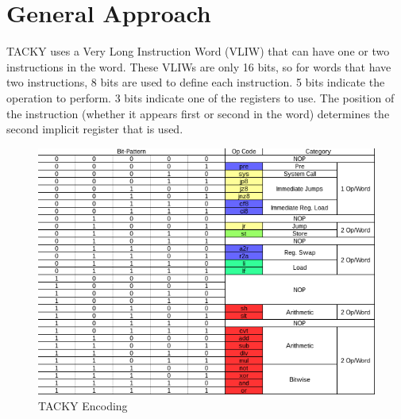 \documentclass[sigconf]{acmart}
\begin{document}
%

%
\maketitle

\section{General Approach}

TACKY uses a Very Long Instruction Word (VLIW) that can have one or two instructions in the word. These VLIWs are only 16 bits, so for words that have two instructions, 8 bits are used to define each instruction. 5 bits indicate the operation to perform. 3 bits indicate one of the registers to use. The position of the instruction (whether it appears first or second in the word) determines the second implicit register that is used.

\begin{figure}[h]
 \centering
  \includegraphics[width=\linewidth]{TACKY_encoding.png}
  \caption{TACKY Encoding}
\end{figure}
\end{document}
